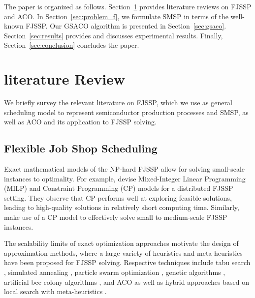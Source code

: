 \documentclass[runningheads]{llncs}
\begin{document}
The paper is organized as follows. 
Section~\ref{sec:lit_rev} provides literature reviews on FJSSP and ACO.
In Section~\ref{sec:problem_f}, we formulate SMSP in terms of the well-known FJSSP. 
Our GSACO algorithm is presented in Section~\ref{sec:gsaco}.
Section~\ref{sec:results} provides and discusses experimental results.
Finally, Section~\ref{sec:conclusion} concludes the paper.

\section{literature Review}
\label{sec:lit_rev}

We briefly survey the relevant literature on FJSSP, which we use as general
scheduling model to represent semiconductor production processes and SMSP,
as well as ACO and its application to FJSSP solving.

\subsection{Flexible Job Shop Scheduling} %

\label{sec:fjssp}

Exact mathematical models of the NP-hard FJSSP allow for solving small-scale instances to optimality. For example, \cite{meng2020mixed} devise Mixed-Integer Linear Programming (MILP) and Constraint Programming (CP) models for a distributed FJSSP setting. 
They observe that CP performs well at exploring feasible solutions,
leading to high-quality solutions in relatively short computing time.
Similarly, \cite{gedik2018constraint} make use of a CP model to effectively solve small to medium-scale FJSSP instances.

The scalability limits of exact optimization approaches motivate the design
of approximation methods, where a large variety of heuristics and meta-heuristics have been proposed for FJSSP solving.
Respective techniques include
tabu search \cite{saidi2007flexible},
simulated annealing \cite{sobeyko2016heuristic},
particle swarm optimization \cite{gao2006solving},
genetic algorithms \cite{ho2007effective},
artificial bee colony algorithms \cite{li2014discrete}, and
ACO \cite{wang2017flexible} as well as
hybrid approaches based on local search with meta-heuristics \cite{li2010improved,xing2010knowledge,thammano2013hybrid,el2017dual}.
\end{document}
